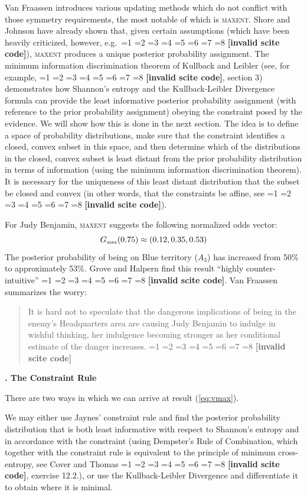 \documentclass[12pt]{article}
\newcommand{\kapt}[1]{\textbf{{\thechap}. #1}\addtocounter{chap}{1}}
\newcommand{\tbd}[1]{}
\newcommand{\qeins}[1]{``#1''}
\newif\ifNumericalOrYear
\newcommand{\PageP}{p.~}
\newcommand{\PageP}{}
\newcommand{\scite}[3]{\ifnum#1=1\ifNumericalOrYear\citep{#2}\else\citeyearpar{#2}\fi\else
\ifnum#1=2\ifNumericalOrYear\citep[#3]{#2}\else\citep[{\PageP}#3]{#2}\fi\else
\ifnum#1=3\ifNumericalOrYear(\citet[#3]{#2})\else\citep[{\PageP}#3]{#2}\fi\else
\ifnum#1=4\ifNumericalOrYear\citet{#2}\else\citet{#2}\fi\else
\ifnum#1=5\ifNumericalOrYear(\citet{#2})\else\citep{#2}\fi\else
\ifnum#1=6\ifNumericalOrYear(\citet[#3]{#2})\else\citep[{\PageP}#3]{#2}\fi\else
\ifnum#1=7\ifNumericalOrYear\citep{#2}\else\citealp{#2}\fi\else
\ifnum#1=8\ifNumericalOrYear\citep[#3]{#2}\else\citealp[{\PageP}#3]{#2}\fi\else
\textbf{[invalid scite code]}\fi\fi\fi\fi\fi\fi\fi\fi}
\newenvironment{quotex}{\begin{quote}\begin{footnotesize}}{\end{footnotesize}\end{quote}}
\begin{document}
Van Fraassen introduces various updating methods which do not conflict
with those symmetry requirements, the most notable of which is
\textsc{maxent}. Shore and Johnson have already shown that, given
certain assumptions (which have been heavily criticized, however,
e.g.\ \scite{7}{uffink96}{}), \textsc{maxent} produces a unique
posterior probability assignment. The minimum information
discrimination theorem of Kullback and Leibler (see, for example,
\scite{7}{csiszar67}{}, section 3) demonstrates how Shannon's entropy
and the Kullback-Leibler Divergence formula can provide the least
informative posterior probability assignment (with reference to the
prior probability assignment) obeying the constraint posed by the
evidence. We will show how this is done in the next section. The idea
is to define a space of probability distributions, make sure that the
constraint identifies a closed, convex subset in this space, and then
determine which of the distributions in the closed, convex subset is
least distant from the prior probability distribution in terms of
information (using the minimum information discrimination theorem). It
is necessary for the uniqueness of this least distant distribution
that the subset be closed and convex (in other words, that the
constraints be affine, see \scite{7}{csiszar67}{}).

For Judy Benjamin, \textsc{maxent} suggests the following normalized
odds vector:
\begin{equation}
  \label{eq:vmax}
  G_{\mbox{{\tiny max}}}(0.75)\approx(0.12,0.35,0.53)\tbd{Use
    constraint rule to calculate this for 3 digits}
\end{equation}
The posterior probability of being on Blue territory ($A_{3}$) has
increased from 50\% to approximately 53\%. Grove and Halpern find this
result \qeins{highly counter-intuitive} \scite{2}{grovehalpern97}{2}.
Van Fraassen summarizes the worry:
\begin{quotex}
  It is hard not to speculate that the dangerous implications of being
  in the enemy's Headquarters area are causing Judy Benjamin to
  indulge in wishful thinking, her indulgence becoming stronger as her
  conditional estimate of the danger increases. \scite{3}{fraassen81}{379}
\end{quotex}

\kapt{The Constraint Rule}

There are two ways in which we can arrive at result ({\ref{eq:vmax}}).

We may either use Jaynes' constraint rule and find the posterior
probability distribution that is both least informative with respect
to Shannon's entropy and in accordance with the constraint (using
Dempster's Rule of Combination, which together with the constraint
rule is equivalent to the principle of minimum cross-entropy, see
Cover and Thomas \scite{8}{coverthomas06}{409}, exercise 12.2.), or
use the Kullback-Leibler Divergence and differentiate it to obtain
where it is minimal.
\end{document}
